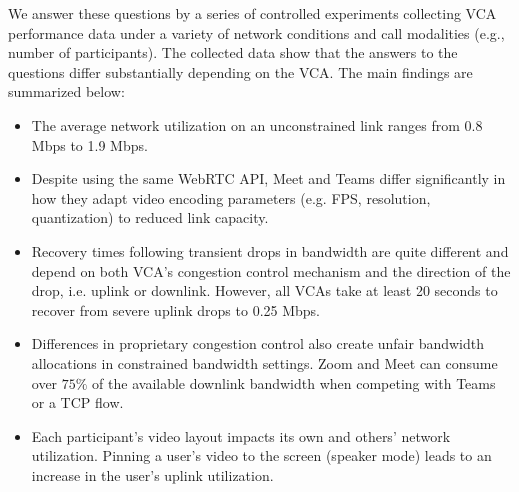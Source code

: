 We answer these questions by a series of controlled experiments collecting VCA performance data under a variety of network conditions and call modalities (e.g., number of participants). The collected data show that the answers to the questions differ substantially depending on the VCA. The main findings are summarized below:%
\begin{itemize}[noitemsep]
    \item The average network utilization on an unconstrained link ranges from 0.8 Mbps to 1.9 Mbps. 
    \item Despite using the same WebRTC API, Meet and Teams differ significantly in how they adapt video encoding parameters (e.g. FPS, resolution, quantization) to reduced link capacity.  
    \item Recovery times following transient drops in bandwidth are quite different and depend on both VCA's congestion control mechanism and the direction of the drop, i.e. uplink or downlink. However, all VCAs take at least 20 seconds to recover from severe uplink drops to 0.25 Mbps. 
    \item Differences in proprietary congestion control also create unfair bandwidth allocations in constrained bandwidth settings. Zoom and Meet can consume over $75\%$ of the available downlink bandwidth when competing with Teams or a TCP flow.
    \item Each participant's video layout impacts its own and others' network utilization. Pinning a user's video to the screen (speaker mode) leads to an increase in the user's uplink utilization.
\end{itemize}




